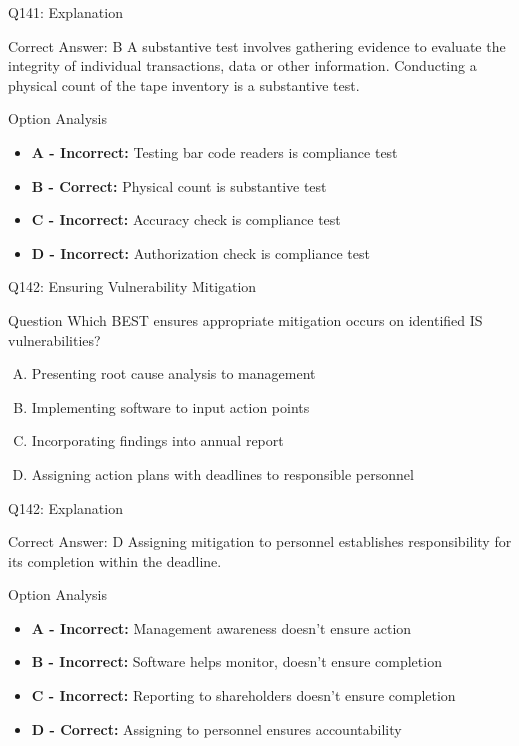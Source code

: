 \documentclass{beamer}
\begin{document}
	\begin{frame}{Q141: Explanation}
		\begin{block}{Correct Answer: B}
			A substantive test involves gathering evidence to evaluate the integrity of individual transactions, data or other information. Conducting a physical count of the tape inventory is a substantive test.
		\end{block}
		\begin{block}{Option Analysis}
			\begin{itemize}
				\item \textbf{A - Incorrect:} Testing bar code readers is compliance test
				\item \textbf{B - Correct:} Physical count is substantive test
				\item \textbf{C - Incorrect:} Accuracy check is compliance test
				\item \textbf{D - Incorrect:} Authorization check is compliance test
			\end{itemize}
		\end{block}
	\end{frame}
	
	\begin{frame}{Q142: Ensuring Vulnerability Mitigation}
		\begin{block}{Question}
			Which BEST ensures appropriate mitigation occurs on identified IS vulnerabilities?
		\end{block}
		\begin{enumerate}[(A)]
			\item Presenting root cause analysis to management
			\item Implementing software to input action points
			\item Incorporating findings into annual report
			\item Assigning action plans with deadlines to responsible personnel
		\end{enumerate}
	\end{frame}
	
	\begin{frame}{Q142: Explanation}
		\begin{block}{Correct Answer: D}
			Assigning mitigation to personnel establishes responsibility for its completion within the deadline.
		\end{block}
		\begin{block}{Option Analysis}
			\begin{itemize}
				\item \textbf{A - Incorrect:} Management awareness doesn't ensure action
				\item \textbf{B - Incorrect:} Software helps monitor, doesn't ensure completion
				\item \textbf{C - Incorrect:} Reporting to shareholders doesn't ensure completion
				\item \textbf{D - Correct:} Assigning to personnel ensures accountability
			\end{itemize}
		\end{block}
	\end{frame}
	
\end{document}
